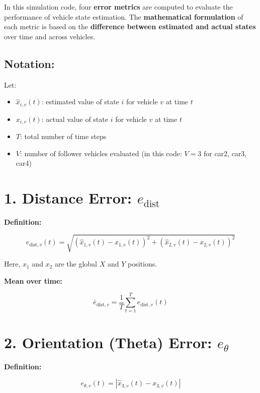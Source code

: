\documentclass{article}
\begin{document}
In this simulation code, four \textbf{error metrics} are computed to evaluate the performance of vehicle state estimation. The \textbf{mathematical formulation} of each metric is based on the \textbf{difference between estimated and actual states} over time and across vehicles.

\subsection*{Notation:}

Let:

\begin{itemize}
    \item $\hat{x}_{i,v}(t)$: estimated value of state $i$ for vehicle $v$ at time $t$
    \item $x_{i,v}(t)$: actual value of state $i$ for vehicle $v$ at time $t$
    \item $T$: total number of time steps
    \item $V$: number of follower vehicles evaluated (in this code: $V = 3$ for car2, car3, car4)
\end{itemize}

\section*{ 1. \textbf{Distance Error}: $e_{\text{dist}}$}

\textbf{Definition:}

\begin{equation}
    e_{\text{dist},v}(t) = \sqrt{ \left( \hat{x}_{1,v}(t) - x_{1,v}(t) \right)^2 + \left( \hat{x}_{2,v}(t) - x_{2,v}(t) \right)^2 }
\end{equation}

Here, $x_1$ and $x_2$ are the global $X$ and $Y$ positions.

\textbf{Mean over time:}

\begin{equation}
    \bar{e}_{\text{dist},v} = \frac{1}{T} \sum_{t=1}^{T} e_{\text{dist},v}(t)
\end{equation}

\section*{ 2. \textbf{Orientation (Theta) Error}: $e_{\theta}$}

\textbf{Definition:}

\begin{equation}
    e_{\theta,v}(t) = \left| \hat{x}_{3,v}(t) - x_{3,v}(t) \right|
\end{equation}
\end{document}
